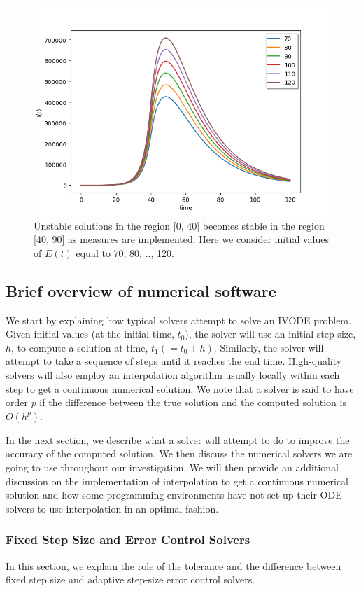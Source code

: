 \begin{figure}[H]
\centering
\includegraphics[width=0.7\linewidth]{./figures/regain_stability_after_measures}
\caption{Unstable solutions in the region [0, 40] becomes stable in the region [40, 90] as measures are implemented. Here we consider initial values of $E(t)$ equal to 70, 80, .., 120.}
\label{fig:regain_stability_after_measures}
\end{figure}

\subsection{Brief overview of numerical software}
We start by explaining how typical solvers attempt to solve an IVODE problem. Given initial values (at the initial time, $t_0$), the solver will use an initial step size, $h$, to compute a solution at time, $t_1 (= t_0 + h)$. Similarly, the solver will attempt to take a sequence of steps until it reaches the end time. High-quality solvers will also employ an interpolation algorithm usually locally within each step to get a continuous numerical solution. We note that a solver is said to have order $p$ if the difference between the true solution and the computed solution is $O(h^p)$.

In the next section, we describe what a solver will attempt to do to improve the accuracy of the computed solution. We then discuss the numerical solvers we are going to use throughout our investigation. We will then provide an additional discussion on the implementation of interpolation to get a continuous numerical solution and how some programming environments have not set up their ODE solvers to use interpolation in an optimal fashion.

\subsubsection{Fixed Step Size and Error Control Solvers}
\label{subsection:fixed_vs_control}
In this section, we explain the role of the tolerance and the difference between fixed step size and adaptive step-size error control solvers.

